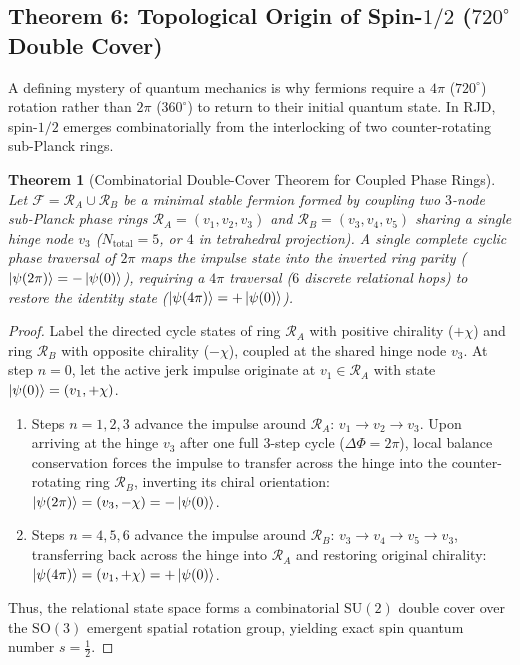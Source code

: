 \documentclass[11pt,a4paper]{article}
\theoremstyle{plain}
\newtheorem{theorem}{Theorem}[section]
\theoremstyle{definition}
\theoremstyle{remark}
\begin{document}
\subsection{Theorem 6: Topological Origin of Spin-$1/2$ ($720^\circ$ Double Cover)}
A defining mystery of quantum mechanics is why fermions require a $4\pi$ ($720^\circ$) rotation rather than $2\pi$ ($360^\circ$) to return to their initial quantum state. In RJD, spin-$1/2$ emerges combinatorially from the interlocking of two counter-rotating sub-Planck rings.

\begin{theorem}[Combinatorial Double-Cover Theorem for Coupled Phase Rings]
\label{thm:spin_half}
Let $\mathcal{F} = \mathcal{R}_A \cup \mathcal{R}_B$ be a minimal stable fermion formed by coupling two $3$-node sub-Planck phase rings $\mathcal{R}_A = (v_1, v_2, v_3)$ and $\mathcal{R}_B = (v_3, v_4, v_5)$ sharing a single hinge node $v_3$ ($N_{\mathrm{total}} = 5$, or $4$ in tetrahedral projection). A single complete cyclic phase traversal of $2\pi$ maps the impulse state into the inverted ring parity ($\ket{\psi(2\pi)} = -\ket{\psi(0)}$), requiring a $4\pi$ traversal ($6$ discrete relational hops) to restore the identity state ($\ket{\psi(4\pi)} = +\ket{\psi(0)}$).
\end{theorem}

\begin{proof}
Label the directed cycle states of ring $\mathcal{R}_A$ with positive chirality ($+\chi$) and ring $\mathcal{R}_B$ with opposite chirality ($-\chi$), coupled at the shared hinge node $v_3$. At step $n=0$, let the active jerk impulse originate at $v_1 \in \mathcal{R}_A$ with state $\ket{\psi(0)} = (v_1, +\chi)$.
\begin{enumerate}
    \item Steps $n = 1, 2, 3$ advance the impulse around $\mathcal{R}_A$: $v_1 \to v_2 \to v_3$. Upon arriving at the hinge $v_3$ after one full $3$-step cycle ($\Delta \Phi = 2\pi$), local balance conservation forces the impulse to transfer across the hinge into the counter-rotating ring $\mathcal{R}_B$, inverting its chiral orientation: $\ket{\psi(2\pi)} = (v_3, -\chi) = -\ket{\psi(0)}$.
    \item Steps $n = 4, 5, 6$ advance the impulse around $\mathcal{R}_B$: $v_3 \to v_4 \to v_5 \to v_3$, transferring back across the hinge into $\mathcal{R}_A$ and restoring original chirality: $\ket{\psi(4\pi)} = (v_1, +\chi) = +\ket{\psi(0)}$.
\end{enumerate}
Thus, the relational state space forms a combinatorial $\mathrm{SU}(2)$ double cover over the $\mathrm{SO}(3)$ emergent spatial rotation group, yielding exact spin quantum number $s = \frac{1}{2}$.
\end{proof}
\end{document}
